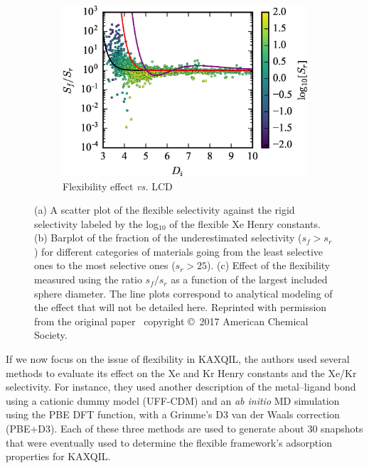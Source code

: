 \documentclass[main]{subfiles}
\begin{document}
\begin{figure}[ht]
\begin{subfigure}[b]{0.32\textwidth}
    \includegraphics[width=\textwidth]{figures/6-perspectives/s_ratio_LCD.jpg}
    \caption{Flexibility effect \emph{vs.} LCD}
  \end{subfigure}
  \caption{ (a) A scatter plot of the flexible selectivity against the rigid selectivity labeled by the log$_10$ of the flexible Xe Henry constants. (b) Barplot of the fraction of the underestimated selectivity ($s_f>s_r$) for different categories of materials going from the least selective ones to the most selective ones ($s_r>25$). (c) Effect of the flexibility measured using the ratio $s_f/s_r$ as a function of the largest included sphere diameter. The line plots correspond to analytical modeling of the effect that will not be detailed here. Reprinted with permission from the original paper~\cite{Witman_2017} copyright \copyright\ 2017 American Chemical Society. }\label{fgr:flexibility_study}
\end{figure}

If we now focus on the issue of flexibility in KAXQIL, the authors used several methods to evaluate its effect on the Xe and Kr Henry constants and the Xe/Kr selectivity. For instance, they used another description of the metal--ligand bond using a cationic dummy model (UFF-CDM) and an \emph{ab initio} MD simulation using the PBE DFT function,\autocite{Perdew_1996} with a Grimme's D3 van der Waals correction\autocite{Grimme_2010} (PBE+D3). Each of these three methods are used to generate about $30$ snapshots that were eventually used to determine the flexible framework's adsorption properties for KAXQIL.
\end{document}
